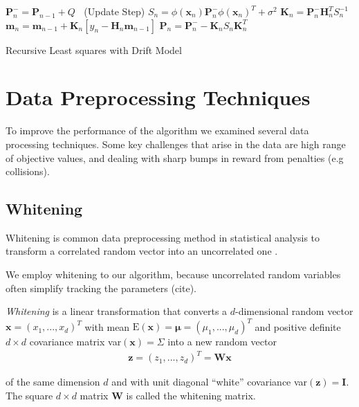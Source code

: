 \begin{algorithm}[H]
\DontPrintSemicolon
\SetAlgoLined


{
  $\mathbf{P}_n^- = \mathbf{P}_{n-1} + Q$ \;
  $~$ \;
  \Begin(Update Step)
  {
    $S_n = \phi(\mathbf{x}_n) \mathbf{P}_n^- \phi(\mathbf{x}_n)^T + \sigma^2$ \;
    $\textbf{K}_n = \textbf{P}_{n}^{-} \textbf{H}^T_n S_n^{-1}$ \;
    $\textbf{m}_n = \textbf{m}_{n-1} + \textbf{K}_n [y_n - \textbf{H}_n \textbf{m}_{n-1}]$ \;
    $\textbf{P}_n = \textbf{P}_{n}^{-} - \textbf{K}_n S_n \textbf{K}_n^T $ \;
  }
}
\caption{Recursive Least squares with Drift Model}
\label{RLS:basic}
\end{algorithm}

\section{Data Preprocessing Techniques}
To improve the performance of the algorithm we examined several
data processing techniques. Some key challenges
that arise in the data  are
high range of objective values,
and dealing with sharp bumps in reward from
penalties (e.g collisions).

\subsection{Whitening}
Whitening is common data preprocessing method in statistical analysis
to transform a correlated random vector into an uncorrelated one
\citet{kessy2018optimal}.

We employ whitening to our algorithm, because uncorrelated
random variables often simplify  tracking
the parameters (cite).

\textit{Whitening} is a linear transformation that converts a $d$-dimensional
random vector $\mathbf{x} = (x_1,...,x_d)^T$ with mean
$\text{E}(\mathbf{x}) = \mathbf{\mu} = (\mu_1,...,\mu_d)^T$ and
positive definite $d \times d$ covariance matrix
var$(\mathbf{x}) = \Sigma$ into a new random vector
\begin{align}
  \label{whitening}
 \mathbf{z} = (z_1,...,z_d)^T = \mathbf{W}\mathbf{x}
\end{align}

of the same dimension $d$ and with unit diagonal ``white'' covariance
var$(\mathbf{z}) = \mathbf{I}$. The square $d \times d$
matrix $\mathbf{W}$ is called the whitening matrix.

